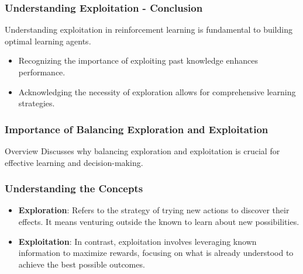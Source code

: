 \documentclass[aspectratio=169]{beamer}
\begin{document}
\begin{frame}[fragile]
    \frametitle{Understanding Exploitation - Conclusion}
    Understanding exploitation in reinforcement learning is fundamental to building optimal learning agents. 
    \begin{itemize}
        \item Recognizing the importance of exploiting past knowledge enhances performance.
        \item Acknowledging the necessity of exploration allows for comprehensive learning strategies.
    \end{itemize}
\end{frame}

\begin{frame}[fragile]
    \frametitle{Importance of Balancing Exploration and Exploitation}
    \begin{block}{Overview}
        Discusses why balancing exploration and exploitation is crucial for effective learning and decision-making.
    \end{block}
\end{frame}

\begin{frame}[fragile]
    \frametitle{Understanding the Concepts}
    \begin{itemize}
        \item \textbf{Exploration}: 
        Refers to the strategy of trying new actions to discover their effects. It means venturing outside the known to learn about new possibilities.
        
        \item \textbf{Exploitation}: 
        In contrast, exploitation involves leveraging known information to maximize rewards, focusing on what is already understood to achieve the best possible outcomes.
    \end{itemize}
\end{frame}
\end{document}
